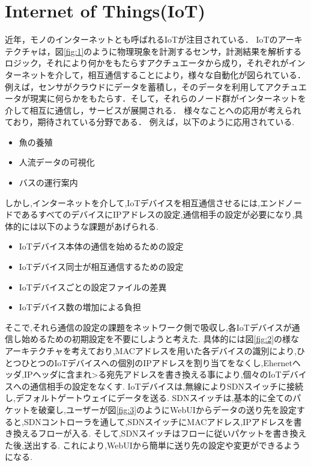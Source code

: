 \documentclass{jsarticle}
\begin{document}
\section{Internet of Things(IoT)}
	近年，モノのインターネットとも呼ばれるIoTが注目されている．
	IoTのアーキテクチャは，図\ref{fig:1}のように物理現象を計測するセンサ，計測結果を解析するロジック，それにより何かをもたらすアクチュエータから成り，それぞれがインターネットを介して，相互通信することにより，様々な自動化が図られている．
	例えば，センサがクラウドにデータを蓄積し，そのデータを利用してアクチュエータが現実に何らかをもたらす．そして，それらのノード群がインターネットを介して相互に通信し，サービスが展開される．
	様々なことへの応用が考えられており，期待されている分野である．
	例えば，以下のように応用されている.
	\begin{itemize}
		\item 魚の養殖
		\item 人流データの可視化
		\item バスの運行案内
	\end{itemize}
	しかし,インターネットを介して,IoTデバイスを相互通信させるには,エンドノードであるすべてのデバイスにIPアドレスの設定,通信相手の設定が必要になり,具体的には以下のような課題があげられる.
	\begin{itemize}
		\item IoTデバイス本体の通信を始めるための設定
		\item IoTデバイス同士が相互通信するための設定
		\item IoTデバイスごとの設定ファイルの差異
		\item IoTデバイス数の増加による負担
	\end{itemize}
	そこで,それら通信の設定の課題をネットワーク側で吸収し,各IoTデバイスが通信し始めるための初期設定を不要にしようと考えた.
	具体的には図\ref{fig:2}の様なアーキテクチャを考えており,MACアドレスを用いた各デバイスの識別により,ひとつひとつのIoTデバイスへの個別のIPアドレスを割り当てをなくし,Ehernetヘッダ,IPヘッダに含まれ>る宛先アドレスを書き換える事により,個々のIoTデバイスへの通信相手の設定をなくす.
	IoTデバイスは,無線によりSDNスイッチに接続し,デフォルトゲートウェイにデータを送る.
	SDNスイッチは,基本的に全てのパケットを破棄し,ユーザーが図\ref{fig:3}のようにWebUIからデータの送り先を設定すると,SDNコントローラを通して,SDNスイッチにMACアドレス,IPアドレスを書き換えるフローが入る.
	そして,SDNスイッチはフローに従いパケットを書き換えた後,送出する.
	これにより,WebUIから簡単に送り先の設定や変更ができるようになる.
\end{document}
